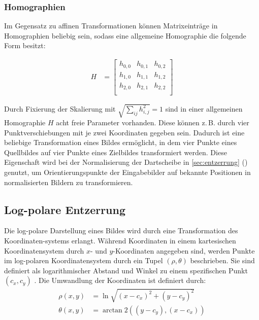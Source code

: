 \newpage
\subsubsection{Homographien}
\label{sec:homographien}

Im Gegensatz zu affinen Transformationen können Matrixeinträge in Homographien beliebig sein, sodass eine allgemeine Homographie die folgende Form besitzt:

\begin{align*}
    H & =
    \left[
        \begin{array}{ccc}
            h_{0, 0} & h_{0, 1} & h_{0, 2} \\
            h_{1, 0} & h_{1, 1} & h_{1, 2} \\
            h_{2, 0} & h_{2, 1} & h_{2, 2} \\
        \end{array}
        \right]
\end{align*}

Durch Fixierung der Skalierung mit $\sqrt{\sum_{ij} h_{i, j}^2} = 1$ sind in einer allgemeinen Homographie $H$ acht freie Parameter vorhanden. Diese können z.\,B. durch vier Punktverschiebungen mit je zwei Koordinaten gegeben sein. Dadurch ist eine beliebige Transformation eines Bildes ermöglicht, in dem vier Punkte eines Quellbildes auf vier Punkte eines Zielbildes transformiert werden. Diese Eigenschaft wird bei der Normalisierung der Dartscheibe in \autoref{sec:entzerrung} () genutzt, um Orientierungspunkte der Eingabebilder auf bekannte Positionen in normalisierten Bildern zu transformieren.


\vfill
\subsection{Log-polare Entzerrung}
\label{sec:logpolare_entzerrung}

Die log-polare Darstellung eines Bildes wird durch eine Transformation des Koordinaten-systems erlangt. Während Koordinaten in einem kartesischen Koordinatensystem durch $x$- und $y$-Koordinaten angegeben sind, werden Punkte im log-polaren Koordinatensystem durch ein Tupel $\left(\rho, \theta\right)$ beschrieben. Sie sind definiert als logarithmischer Abstand und Winkel zu einem spezifischen Punkt $\left(c_x, c_y\right)$ \cite{logpolar}. Die Umwandlung der Koordinaten ist definiert durch:
\begin{align*}
    \rho(x, y)   & = \ln \sqrt{(x - c_x)^ 2 + (y - c_y)^2}      \\
    \theta(x, y) & = \arctan2 \left((y - c_y), (x - c_x)\right)
\end{align*}

